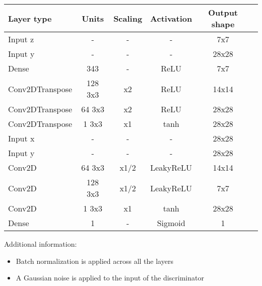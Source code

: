 \begin{table*}[h!]
	\centering
	\begin{tabular}{|l|c|c|c|c|c|}
		\hline
		Layer type & Units & Scaling & Activation & Output shape\\
		\hline
		Input z & - & - & - & 7x7\\
		Input y & - & - & - & 28x28\\
		Dense & 343 & - & ReLU & 7x7\\
		Conv2DTranspose & 128 3x3 & x2 & ReLU & 14x14 \\
		Conv2DTranspose & 64 3x3 & x2 & ReLU & 28x28 \\
		Conv2DTranspose & 1 3x3 & x1 & tanh & 28x28 \\
		\hline
		Input x & - & - & - & 28x28\\
		Input y & - & - & - & 28x28\\
		Conv2D & 64 3x3 & x1/2 & LeakyReLU & 14x14 \\
		Conv2D & 128 3x3 & x1/2 & LeakyReLU & 7x7 \\
		Conv2D & 1 3x3 & x1 & tanh & 28x28 \\
		Dense & 1 & - & Sigmoid & 1\\
		\hline
	\end{tabular}
\end{table*}

Additional information: \begin{itemize}
	\item Batch normalization \citep{Ioffe2015} is applied across all the layers
	\item A Gaussian noise is applied to the input of the discriminator
\end{itemize}

